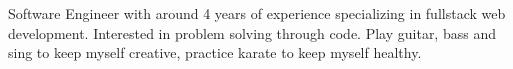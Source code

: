 

\begin{cvparagraph}

Software Engineer with around 4 years of experience specializing in fullstack web development. Interested in problem solving through code. Play guitar, bass and sing to keep myself creative, practice karate to keep myself healthy.

\end{cvparagraph}
